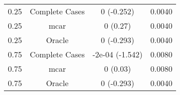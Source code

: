 \begin{table}[ht]
\centering
\begin{tabular}{cccc}
  \hline
  \hline
0.25 & Complete Cases & 0 (-0.252) & 0.0040 \\ 
  0.25 & mcar & 0 (0.27) & 0.0040 \\ 
  0.25 & Oracle & 0 (-0.293) & 0.0040 \\ 
  0.75 & Complete Cases & -2e-04 (-1.542) & 0.0080 \\ 
  0.75 & mcar & 0 (0.03) & 0.0080 \\ 
  0.75 & Oracle & 0 (-0.293) & 0.0040 \\ 
   \hline
\end{tabular}
\end{table}
